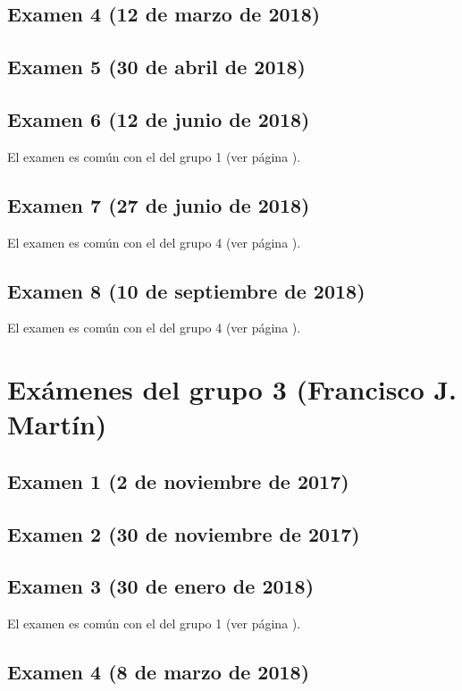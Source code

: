 \documentclass[a4paper,12pt,twoside]{book}
\begin{document}
\subsection{Examen 4 (12 de marzo de 2018)}
\subsection{Examen 5 (30 de abril de 2018)}
\subsection{Examen 6 (12 de junio de 2018)}
El examen es común con el del grupo 1 (ver página \pageref{examen_17_18_1_6}).
\subsection{Examen 7 (27 de junio de 2018)}
El examen es común con el del grupo 4 (ver página \pageref{examen_17_18_4_7}).
\subsection{Examen 8 (10 de septiembre de 2018)}
El examen es común con el del grupo 4 (ver página \pageref{examen_17_18_4_8}).

\section{Exámenes del grupo 3 (Francisco J. Martín)}
\subsection{Examen 1 (2 de noviembre de 2017)}
\subsection{Examen 2 (30 de noviembre de 2017)}
\subsection{Examen 3 (30 de enero de 2018)}
El examen es común con el del grupo 1 (ver página \pageref{examen_17_18_1_3}).
\subsection{Examen 4 (8 de marzo de 2018)}
\end{document}
